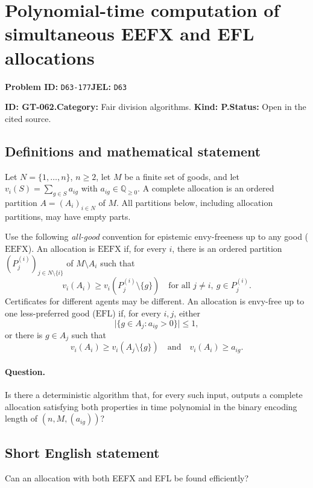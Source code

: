 \documentclass[11pt,a4paper]{article}
\begin{document}
\section*{Polynomial-time computation of simultaneous EEFX and EFL allocations}
\textbf{Problem ID:} \texttt{D63-177}\quad \textbf{JEL:} \texttt{D63}\par
\label{problem:OP-0192}
\label{game:GT-062}
{\sffamily\small\color{muted}
\noindent\textbf{ID: GT-062.}\quad\textbf{Category:} Fair division algorithms.
\quad\textbf{Kind: P.}\quad\textbf{Status:} Open in the cited source.
\par}
\subsection*{Definitions and mathematical statement}
Let \(N=\{1,\ldots,n\}\), \(n\geq 2\), let \(M\) be a finite set of goods,
and let \(v_i(S)=\sum_{g\in S}a_{ig}\) with
\(a_{ig}\in\mathbb Q_{\geq 0}\). A complete allocation is an ordered
partition \(A=(A_i)_{i\in N}\) of \(M\).
All partitions below, including allocation partitions, may have empty parts.

Use the following \emph{all-good} convention for epistemic envy-freeness
up to any good (\(\mathrm{EEFX}\)). An allocation is \(\mathrm{EEFX}\)
if, for every \(i\), there is an ordered partition
\((P^{(i)}_j)_{j\in N\setminus\{i\}}\) of \(M\setminus A_i\) such that
\[
 v_i(A_i)\geq v_i(P^{(i)}_j\setminus\{g\})
 \quad\text{for all }j\ne i,\ g\in P^{(i)}_j.
\]
Certificates for different agents may be different.
An allocation is envy-free up to one less-preferred good
(\(\mathrm{EFL}\)) if, for every \(i,j\), either
\[
 \bigl|\{g\in A_j:a_{ig}>0\}\bigr|\leq 1,
\]
or there is \(g\in A_j\) such that
\[
 v_i(A_i)\geq v_i(A_j\setminus\{g\})
 \quad\text{and}\quad
 v_i(A_i)\geq a_{ig}.
\]

\paragraph{Question.}
Is there a deterministic algorithm that, for every such input, outputs
a complete allocation satisfying both properties in time polynomial in
the binary encoding length of \((n,M,(a_{ig}))\)?

\subsection*{Short English statement}
Can an allocation with both EEFX and EFL be found efficiently?
\end{document}
